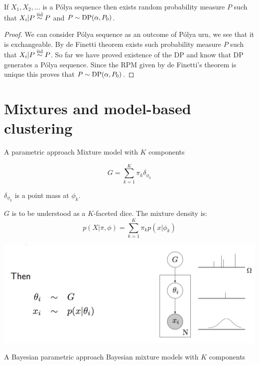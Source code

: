 \begin{theorem}
If $X_1,X_2,\ldots $ is a P\'olya sequence then exists random probability measure $P$ such that $X_i|P\stackrel{\mbox{\scriptsize{iid}}}{\sim} P$ and $P\sim \text{DP}(\alpha, P_0)$.
\end{theorem}

\begin{proof}
We can consider P\'olya sequence as an outcome of P\'olya urn, we see that it is exchangeable. By de Finetti theorem exists such probability measure $P$ such that $X_i|P \stackrel{\mbox{\scriptsize{iid}}}{\sim} P$. So far we have proved existence of the DP and know that DP generates a P\'olya sequence. Since the RPM given by de Finetti's theorem is unique this proves that
$P\sim \text{DP}(\alpha, P_0)$.
\end{proof}



\section{Mixtures and model-based clustering}



{A {parametric} approach}
 Mixture model with $K$ components
	
	$$G = \sum_{k=1}^K \pi_k \delta_{\phi_k}$$
	
	$\delta_{\phi_k}$ is a point mass at ${\phi_k}$.
	
	$G$ is to be understood as a $K$-faceted dice. The  mixture density is:
	$$p(X|\pi,\phi) = \sum_{k=1}^K \pi_k p(x|\phi_k)$$
	
\begin{center}
		\includegraphics[width=.8\textwidth]{figures_julyan/mixtures/plate_mixture}
\end{center}




{A {Bayesian parametric} approach}
	 \alert{Bayesian}   mixture models with $K$ components
	
